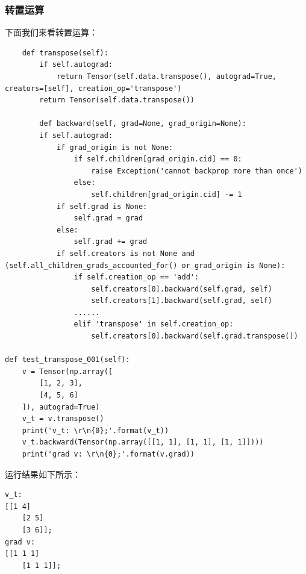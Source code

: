 \subsubsection{转置运算}
下面我们来看转置运算：
\begin{lstlisting}
    def transpose(self):
        if self.autograd:
            return Tensor(self.data.transpose(), autograd=True, creators=[self], creation_op='transpose')
		return Tensor(self.data.transpose())
		
		def backward(self, grad=None, grad_origin=None):
        if self.autograd:
            if grad_origin is not None:
                if self.children[grad_origin.cid] == 0:
                    raise Exception('cannot backprop more than once')
                else:
                    self.children[grad_origin.cid] -= 1
            if self.grad is None:
                self.grad = grad
            else:
                self.grad += grad
            if self.creators is not None and (self.all_children_grads_accounted_for() or grad_origin is None):
                if self.creation_op == 'add':
                    self.creators[0].backward(self.grad, self)
					self.creators[1].backward(self.grad, self)
				......
                elif 'transpose' in self.creation_op:
					self.creators[0].backward(self.grad.transpose())
					
def test_transpose_001(self):
	v = Tensor(np.array([
		[1, 2, 3],
		[4, 5, 6]
	]), autograd=True)
	v_t = v.transpose()
	print('v_t: \r\n{0};'.format(v_t))
	v_t.backward(Tensor(np.array([[1, 1], [1, 1], [1, 1]])))
	print('grad v: \r\n{0};'.format(v.grad))
\end{lstlisting}
运行结果如下所示：
\begin{lstlisting}
v_t:
[[1 4]
	[2 5]
	[3 6]];
grad v:
[[1 1 1]
	[1 1 1]];
\end{lstlisting}

